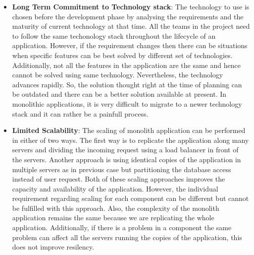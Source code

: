 \begin{itemize}[leftmargin=.5in]
\\
\item \textbf{Long Term Commitment to Technology stack}: The technology to use is chosen before the development phase by analysing the requirements and the maturity of current technology at that time. All the teams in the project need to follow the same techonology stack throughout the lifecycle of an application. However, if the requirement changes then there can be situations when specific features can be best solved by different set of technologies. Additionally, not all the features in the application are the same and hence cannot be solved using same technology. Nevertheless, the technology advances rapidly. So, the solution thought right at the time of planning can be outdated and there can be a better solution available at present. In monolithic applications, it is very difficult to migrate to a newer technology stack and it can rather be a painfull process.
\\
\item \textbf{Limited Scalability}: The scaling of monolith application can be performed in either of two ways. The first way is to replicate the application along many servers and dividing the incoming request using a load balancer in front of the servers. Another approach is using identical copies of the application in multiple servers as in previous case but partitioning the database access instead of user request. Both of these scaling approaches improves the capacity and availability of the application. However, the individual requirement regarding scaling for each component can be different but cannot be fulfilled with this approach. Also, the complexity of the monolith application remains the same because we are replicating the whole application. Additionally, if there is a problem in a component the same problem can affect all the servers running the copies of the application, this does not improve resilency.\cite{MacVittie:2014aa}\cite{Namiot:2014aa}
\end{itemize}
\\

